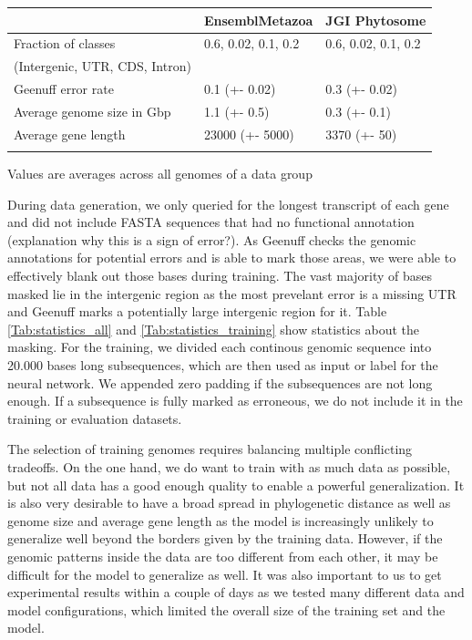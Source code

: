 \documentclass{bioinfo}
\begin{document}
\begin{methods}
\begin{table}[!t]
 {
\begin{tabular}{@{}lll@{}}
\toprule & EnsemblMetazoa & JGI Phytosome\\
\midrule
Fraction of classes  & 0.6, 0.02, 0.1, 0.2 & 0.6, 0.02, 0.1, 0.2 \\
(Intergenic, UTR, CDS, Intron) & & \\
Geenuff error rate & 0.1 (+- 0.02) & 0.3 (+- 0.02) \\
Average genome size in Gbp& 1.1 (+- 0.5) & 0.3 (+- 0.1) \\
Average gene length & 23000 (+- 5000) & 3370 (+- 50) \\
\botrule
\end{tabular}}{Values are averages across all genomes of a data group}
\end{table}

	During data generation, we only queried for the longest transcript of each gene and did not include FASTA sequences that had no functional annotation (explanation why this is a sign of error?). As Geenuff checks the genomic annotations for potential errors and is able to mark those areas, we were able to effectively blank out those bases during training. The vast majority of bases masked lie in the intergenic region as the most prevelant error is a missing UTR and Geenuff marks a potentially large intergenic region for it. Table \ref{Tab:statistics_all} and \ref{Tab:statistics_training} show statistics about the masking. For the training, we divided each continous genomic sequence into 20.000 bases long subsequences, which are then used as input or label for the neural network. We appended zero padding if the subsequences are not long enough. If a subsequence is fully marked as erroneous, we do not include it in the training or evaluation datasets.

The selection of training genomes requires balancing multiple conflicting tradeoffs. On the one hand, we do want to train with as much data as possible, but not all data has a good enough quality to enable a powerful generalization. It is also very desirable to have a broad spread in phylogenetic distance as well as genome size and average gene length as the model is increasingly unlikely to generalize well beyond the borders given by the training data. However, if the genomic patterns inside the data are too different from each other, it may be difficult for the model to generalize as well. It was also important to us to get experimental results within a couple of days as we tested many different data and model configurations, which limited the overall size of the training set and the model. 
	

\end{methods}
\end{document}
